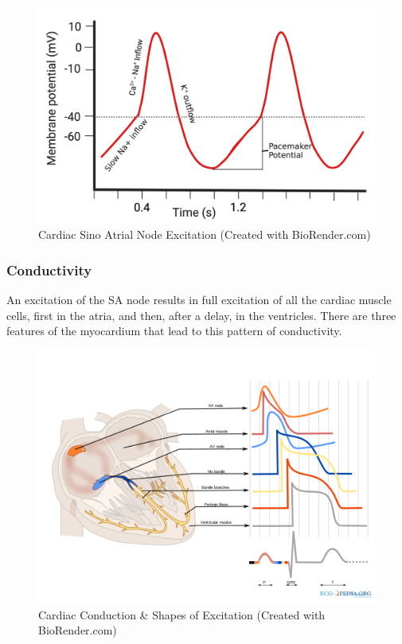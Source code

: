 \begin{figure}[!h]
    \centering
    \includegraphics[width=0.5\linewidth]{./figure/Cardiac_SA_Node_AP.png}
    \caption{Cardiac Sino Atrial Node Excitation \footnotesize{(Created with BioRender.com)}}
    \label{fig:Cardiac_SA_Node_AP}
\end{figure}

\subsubsection{Conductivity} 

An excitation of the SA node results in full excitation of all the cardiac muscle cells, first in the atria, and then, after a delay, in the ventricles. There are three features of the myocardium that lead to this pattern of conductivity. 

\begin{figure}[!h]
    \centering
    \includegraphics[width=1\linewidth]{./figure/Cardiac_Conduction.png}
    \caption{Cardiac Conduction \& Shapes of Excitation \footnotesize{(Created with BioRender.com)}}
    \label{fig:Cardiac_Conduction}
\end{figure}

